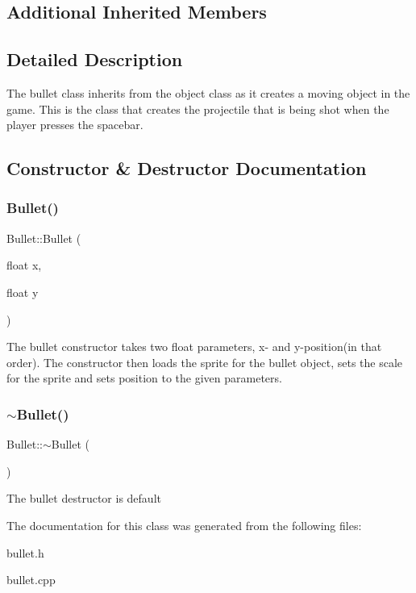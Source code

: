 \subsection*{Additional Inherited Members}


\subsection{Detailed Description}
The bullet class inherits from the object class as it creates a moving object in the game. This is the class that creates the projectile that is being shot when the player presses the spacebar. 

\subsection{Constructor \& Destructor Documentation}
\mbox{\label{classBullet_a5d934d668d3335e10f87302190608f57}} 
\subsubsection{\texorpdfstring{Bullet()}{Bullet()}}
{\footnotesize\ttfamily Bullet\+::\+Bullet (\begin{DoxyParamCaption}\item[{float}]{x,  }\item[{float}]{y }\end{DoxyParamCaption})}

The bullet constructor takes two float parameters, x-\/ and y-\/position(in that order). The constructor then loads the sprite for the bullet object, sets the scale for the sprite and sets position to the given parameters. \mbox{\label{classBullet_a9e4f14ca4d33ad9445f13610135aa1f1}} 
\subsubsection{\texorpdfstring{$\sim$\+Bullet()}{~Bullet()}}
{\footnotesize\ttfamily Bullet\+::$\sim$\+Bullet (\begin{DoxyParamCaption}{ }\end{DoxyParamCaption})\hspace{0.3cm}{\ttfamily [default]}}

The bullet destructor is default 

The documentation for this class was generated from the following files\+:\begin{DoxyCompactItemize}
\item 
bullet.\+h\item 
bullet.\+cpp\end{DoxyCompactItemize}

